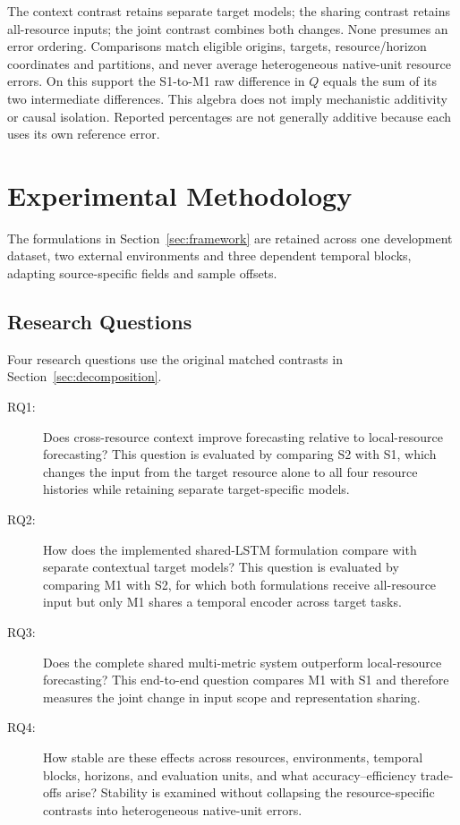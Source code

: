 \documentclass[a4paper,fleqn]{cas-dc}
\begin{document}
The context contrast retains separate target models; the sharing contrast
retains all-resource inputs; the joint contrast combines both changes.
None presumes an error ordering. Comparisons match eligible origins, targets,
resource/horizon coordinates and partitions, and never average heterogeneous
native-unit resource errors. On this support the S1-to-M1 raw difference in
$Q$ equals the sum of its two intermediate differences. This algebra does
not imply mechanistic additivity or causal isolation. Reported percentages
are not generally additive because each uses its own reference error.

\section{Experimental Methodology}
\label{sec:methodology}

The formulations in Section~\ref{sec:framework} are retained across one
development dataset, two external environments and three dependent temporal
blocks, adapting source-specific fields and sample offsets.

\subsection{Research Questions}
\label{sec:research-questions}

Four research questions use the original matched contrasts in
Section~\ref{sec:decomposition}.

\begin{description}
  \item[RQ1:] Does cross-resource context improve forecasting relative to
    local-resource forecasting?  This question is evaluated by comparing S2
    with S1, which changes the input from the target resource alone to all four
    resource histories while retaining separate target-specific models.
  \item[RQ2:] How does the implemented shared-LSTM formulation compare with
    separate contextual target models? This question is evaluated by
    comparing M1 with S2, for which both formulations receive all-resource
    input but only M1 shares a temporal encoder across target tasks.
  \item[RQ3:] Does the complete shared multi-metric system outperform
    local-resource forecasting?  This end-to-end question compares M1 with S1
    and therefore measures the joint change in input scope and representation
    sharing.
  \item[RQ4:] How stable are these effects across resources, environments,
    temporal blocks, horizons, and evaluation units, and what
    accuracy--efficiency trade-offs arise?  Stability is examined without
    collapsing the resource-specific contrasts into heterogeneous native-unit
    errors.
\end{description}
\end{document}
